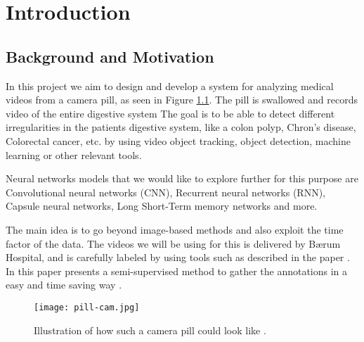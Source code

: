 \documentclass[thesis.tex]{subfiles}
\begin{document}
\chapter{Introduction} \label{introduction}

\section{Background and Motivation} \label{background_and_motivation}
In this project we aim to design and develop a system for analyzing medical videos from a camera pill, as seen in Figure \ref{fig:pill-cam}. The pill is swallowed and records video of the entire digestive system The goal is to be able to detect different irregularities in the patients digestive system, like a colon polyp, Chron's disease, Colorectal cancer, etc. by using video object tracking, object detection, machine learning or other relevant tools.

Neural networks models that we would like to explore further for this purpose are Convolutional neural networks (CNN), Recurrent neural networks (RNN), Capsule neural networks, Long Short-Term memory networks and more.

The main idea is to go beyond image-based methods and also exploit the time factor of the data. 
The videos we will be using for this is delivered by Bærum Hospital, and is carefully labeled by using tools such as described in the paper . In this paper \citeauthor*{ExpertDriven15} presents a semi-supervised method to gather the annotations in a easy and time saving way \cite{ExpertDriven15}. 

\begin{figure}[H] %
  \begin{center}
    \texttt{[image: pill-cam.jpg]}
    \caption[Illustration of how such a camera pill could look like]{Illustration of how such a camera pill could look like \cite{PillCamCamera}.}
    \label{fig:pill-cam}
  \end{center}
\end{figure}
\end{document}

